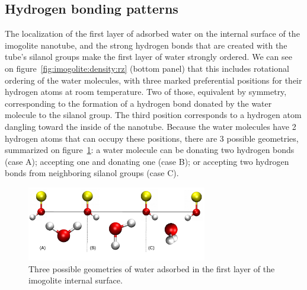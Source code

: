 \documentclass[thesis]{subfiles}
\begin{document}
\FloatBarrier
\subsection{Hydrogen bonding patterns}

The localization of the first layer of adsorbed water on the internal surface of
the imogolite nanotube, and the strong hydrogen bonds that are created with the
tube's silanol groups make the first layer of water strongly ordered. We can see
on figure~\ref{fig:imogolite:density:rz} (bottom panel) that this includes
rotational ordering of the water molecules, with three marked preferential
positions for their hydrogen atoms at room temperature. Two of those, equivalent
by symmetry, corresponding to the formation of a hydrogen bond donated by the
water molecule to the silanol group. The third position corresponds to a
hydrogen atom dangling toward the inside of the nanotube.  Because the water
molecules have 2 hydrogen atoms that can occupy these positions, there are 3
possible geometries, summarized on figure~\ref{fig:imogolite:hbonds:surface}: a
water molecule can be donating two hydrogen bonds (case A); accepting one and
donating one (case B); or accepting two hydrogen bonds from neighboring silanol
groups (case C).

\begin{figure}[ht]
    \centering
    \includegraphics[width=0.7\textwidth]{figures/images/imogolite-hbonds-surface}
	\caption{Three possible geometries of water adsorbed in the first layer of
    the imogolite internal surface.}
    \label{fig:imogolite:hbonds:surface}
\end{figure}

\end{document}

